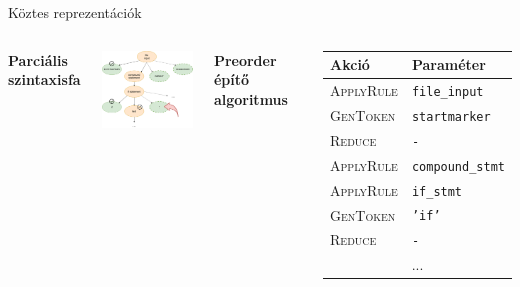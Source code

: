 \documentclass[10pt]{beamer}
\begin{document}
\begin{frame}{Köztes reprezentációk}
  \begin{columns}[T]
    \begin{center}
      \textbf{Parciális szintaxisfa}
    \end{center}
    \vspace{0.2cm}
    \begin{center}
      \includegraphics[width=5cm]{syntax_tree.png}
    \end{center}
    \begin{center}
      \textbf{Preorder építő algoritmus}
    \end{center}
    \vspace{0.2cm}
    \begin{center}
      \renewcommand{\arraystretch}{0.85}
      \begin{tabular}{ll}
      \toprule
      Akció & Paraméter\\
      \midrule
      \small\textsc{ApplyRule} & \footnotesize\texttt{file\_input}\\
      \small\textsc{GenToken}  & \footnotesize\texttt{startmarker}\\
      \small\textsc{Reduce}    & \footnotesize\texttt{-}\\
      \small\textsc{ApplyRule} & \footnotesize\texttt{compound\_stmt}\\
      \small\textsc{ApplyRule} & \footnotesize\texttt{if\_stmt}\\
      \small\textsc{GenToken}  & \footnotesize\texttt{'if'}\\
      \small\textsc{Reduce}    & \footnotesize\texttt{-}\\
      \multicolumn{2}{c}{...} \\
      \bottomrule
    \end{tabular}
    \end{center}
  \end{columns}
\end{frame}
\end{document}
